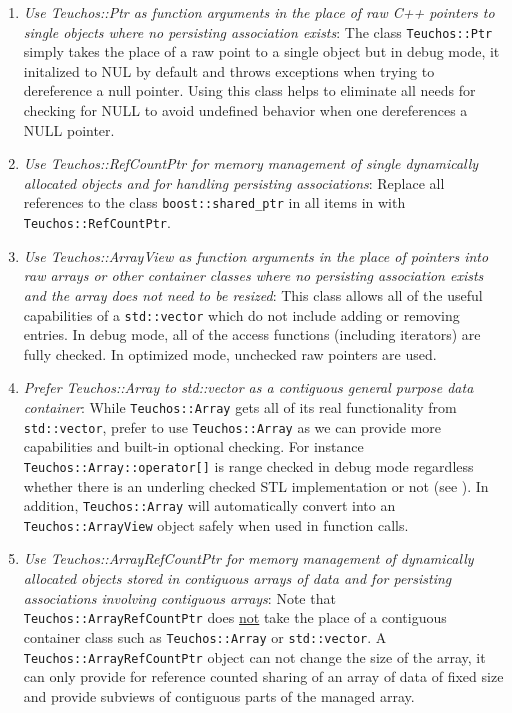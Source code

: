 \begin{enumerate}
{}\item\textit{Use Teuchos::Ptr as function arguments in the place of raw C++
pointers to single objects where no persisting association exists}: The class
{}\texttt{Teuchos\-::Ptr} simply takes the place of a raw point to a single
object but in debug mode, it initalized to NUL by default and throws
exceptions when trying to dereference a null pointer.  Using this class helps
to eliminate all needs for checking for NULL to avoid undefined behavior when
one dereferences a NULL pointer.

{}\item\textit{Use Teuchos::RefCountPtr for memory management of single
dynamically allocated objects and for handling persisting
{}\cite{RefCountPtrBeginnersGuide} associations}: Replace all references to
the class {}\texttt{boost::\-shared\_ptr} in all items in
{}\cite{C++CodingStandards05} with {}\texttt{Teuchos::\-RefCountPtr}.

{}\item\textit{Use Teuchos::ArrayView as function arguments in the place of
pointers into raw arrays or other container classes where no persisting
association exists and the array does not need to be resized}: This class
allows all of the useful capabilities of a {}\texttt{std::vector} which do not
include adding or removing entries.  In debug mode, all of the access
functions (including iterators) are fully checked.  In optimized mode,
unchecked raw pointers are used.

{}\item\textit{Prefer Teuchos::Array to std::vector as a contiguous general
purpose data container}: While {}\texttt{Teuchos::\-Array} gets all of its
real functionality from {}\texttt{std::\-vector}, prefer to use
{}\texttt{Teuchos::\-Array} as we can provide more capabilities and built-in
optional checking.  For instance {}\texttt{Teuchos::\-Array::\-operator[]} is
range checked in debug mode regardless whether there is an underling checked
STL implementation or not (see {}\cite[Item 83]{C++CodingStandards05}).  In
addition, {}\texttt{Teuchos\-::Array} will automatically convert into an
{}\texttt{Teuchos\-::ArrayView} object safely when used in function calls.

{}\item\textit{Use Teuchos::ArrayRefCountPtr for memory management of
dynamically allocated objects stored in contiguous arrays of data and for
persisting associations involving contiguous arrays}: Note that
{}\texttt{Teuchos::ArrayRefCountPtr} does {}\underline{not} take the place of
a contiguous container class such as {}\texttt{Teuchos::\-Array} or
{}\texttt{std::\-vector}.  A {}\texttt{Teuchos::ArrayRefCountPtr} object can
not change the size of the array, it can only provide for reference counted
sharing of an array of data of fixed size and provide subviews of contiguous
parts of the managed array.


\end{enumerate}
